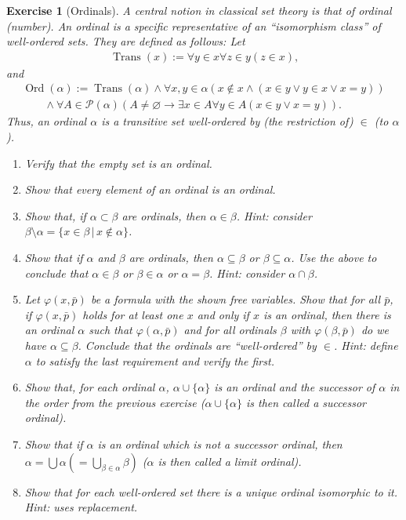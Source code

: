 \documentclass{scrartcl}
\theoremstyle{definition}
\theoremstyle{plain}
\theoremstyle{remark}
\newcommand{\limp}{\rightarrow}
\newcommand{\Pow}{\mathcal{P}}
\newcommand{\sep}{\,|\,}
\newcommand{\eqdef}{:=}
\DeclareMathOperator{\Trans}{Trans}
\DeclareMathOperator{\Ord}{Ord}
\theoremstyle{plain}
\newtheorem{Exc}{Exercise}
\begin{document}
\begin{Exc}[Ordinals\label{exc:ord}]
  A central notion in classical set theory is that of ordinal (number). An ordinal is a specific representative of an ``isomorphism class'' of well-ordered sets. They are defined as follows: Let
  \begin{align*}
    \Trans(x) \eqdef \forall y \in x \forall z \in y (z \in x)\mbox{,}
  \end{align*}
  and
  \begin{align*}
    \Ord(\alpha) \eqdef \Trans(\alpha) \land \forall x, y \in \alpha (x \not\in x \land (x \in y \lor y \in x \lor x = y))\\
    \qquad \land \forall A \in \Pow(\alpha) (A \not= \varnothing \limp \exists x \in A \forall y \in A (x \in y \lor x = y))\text{.}
  \end{align*}
  Thus, an ordinal $\alpha$ is a transitive set well-ordered by (the restriction of) $\in$ (to $\alpha$).
  \begin{enumerate}
  \item Verify that the empty set is an ordinal.
  \item Show that every element of an ordinal is an ordinal.
  \item Show that, if $\alpha \subset \beta$ are ordinals, then $\alpha \in \beta$. Hint: consider $\beta \setminus \alpha = \{x \in \beta \sep x \not\in \alpha\}$.
  \item Show that if $\alpha$ and $\beta$ are ordinals, then $\alpha \subseteq \beta$ or $\beta \subseteq \alpha$. Use the above to conclude that $\alpha \in \beta$ or $\beta \in \alpha$ or $\alpha = \beta$. Hint: consider $\alpha \cap \beta$.
  \item Let $\varphi(x,\bar{p})$ be a formula with the shown free variables. Show that for all $\bar{p}$, if $\varphi(x,\bar{p})$ holds for at least one $x$ and only if $x$ is an ordinal, then there is an ordinal $\alpha$ such that $\varphi(\alpha,\bar{p})$ and for all ordinals $\beta$ with $\varphi(\beta,\bar{p})$ do we have $\alpha \subseteq \beta$. Conclude that the ordinals are ``well-ordered'' by $\in$. Hint: define $\alpha$ to satisfy the last requirement and verify the first.
  \item Show that, for each ordinal $\alpha$, $\alpha \cup \{\alpha\}$ is an ordinal and the successor of $\alpha$ in the order from the previous exercise ($\alpha \cup \{\alpha\}$ is then called a successor ordinal).
  \item Show that if $\alpha$ is an ordinal which is not a successor ordinal, then $\alpha = \bigcup \alpha (= \bigcup_{\beta \in \alpha} \beta)$ ($\alpha$ is then called a limit ordinal).
  \item Show that for each well-ordered set there is a unique ordinal isomorphic to it. Hint: uses replacement.
  \end{enumerate}
\end{Exc}
\end{document}
